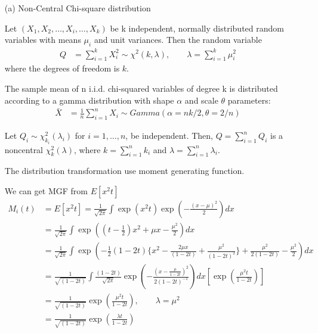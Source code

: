 \begin{itemize}

\item[(a)] Non-Central Chi-square distribution
\begin{Definition}
Let $(X_{1},X_{2},\ldots ,X_{i},\ldots ,X_{k})$ be k independent, normally distributed random variables with means $\mu _{i}$ and unit variances. Then the random variable
\begin{align*}
    Q &= \sum_{i=1}^k X_i^2 \sim \chi^2(k, \lambda), \qquad \lambda = \sum_{i=1}^k \mu_i^2
\end{align*}
where the degrees of freedom is $k$.


The sample mean of n i.i.d. chi-squared variables of degree k is distributed according to a gamma distribution with shape $\alpha$  and scale $\theta$  parameters:
\begin{align*}
	\bar{X} &= \frac{1}{n} \sum_{i=1}^n X_i \sim Gamma(\alpha = nk/2, \theta = 2/n)
\end{align*}
\end{Definition}

\begin{Lemma}	

Let $Q_i \sim \chi^2 _{k_i}(\lambda_i)$ for $i=1,…,n$, be independent. Then, $Q = \sum_{i=1}^n Q_i$ is a noncentral $\chi^2_k(\lambda)$, where $k = \sum_{i=1}^n k_i$ and $\lambda =\sum_{i=1}^n \lambda_i$.
\end{Lemma}


The distribution transformation use moment generating function.

We can get MGF from $E[x^2 t]$
\begin{align*}
	M_i(t) &= E[x^2 t] = \frac{1}{\sqrt{2\pi}} \int \exp(x^2 t) \exp \left( - \frac{(x-\mu)^2}{2} \right) dx\\
	&=  \frac{1}{\sqrt{2\pi}}  \int \exp \left( (t- \frac{1}{2}) x^2 + \mu x -\frac{\mu^2}{2} \right) dx \\
	&=  \frac{1}{\sqrt{2\pi}}  \int \exp \left(  -\frac{1}{2}(1-2t) \{ x^2 - \frac{2 \mu x}{(1-2t)} + \frac{\mu^2}{(1-2t)^2} \} + \frac{\mu^2}{2(1-2t)} -\frac{\mu^2}{2}  \right) dx \\
	&= \frac{1}{\sqrt{(1-2t)}} \int \frac{(1-2t)}{\sqrt{2\pi}} \exp\left( -\frac{(x-\frac{\mu}{1-2t})^2}{2 (1-2t)^{-1}} \right) dx \left[\exp \left( \frac{\mu^2 t}{1-2t} \right) \right]\\
	&=\frac{1}{\sqrt{(1-2t)}} \exp \left( \frac{\mu^2 t}{1-2t} \right), \qquad \lambda = \mu^2\\
	&=\frac{1}{\sqrt{(1-2t)}} \exp \left( \frac{\lambda t}{1-2t} \right)
\end{align*}


\end{itemize}
